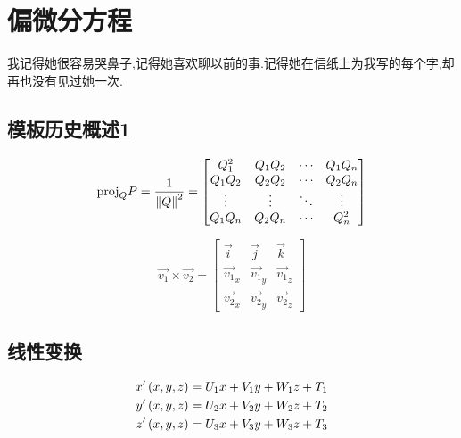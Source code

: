 \chapter{偏微分方程}
\begin{center}
    \textcolor[RGB]{255, 0, 0}{\faHeart}我记得她很容易哭鼻子,记得她喜欢聊以前的事.记得她在信纸上为我写的每个字,却再也没有见过她一次.\textcolor[RGB]{255, 0, 0}{\faHeart}
\end{center}
\vspace{-5pt}
\begin{center}
\end{center}

\section{模板历史概述1}
\[
    \mathrm{proj}_QP=\frac{1}{\left\| Q \right\|^2}=
    \begin{bmatrix}
        Q_1^2  & Q_1Q_2 & \cdots & Q_1Q_n \\
        Q_1Q_2 & Q_2Q_2 & \cdots & Q_2Q_n \\
        \vdots & \vdots & \ddots & \vdots \\
        Q_1Q_n & Q_2Q_n & \cdots & Q_n^2  \\
    \end{bmatrix}
\]

\[
    \overrightarrow{v_1} \times \overrightarrow{v_2} = \begin{bmatrix}
        \vec{i}                & \vec{j}                & \vec{k}                \\
        \overrightarrow{v_1}_x & \overrightarrow{v_1}_y & \overrightarrow{v_1}_z \\
        \overrightarrow{v_2}_x & \overrightarrow{v_2}_y & \overrightarrow{v_2}_z
    \end{bmatrix}
\]

\section{线性变换}

\begin{align*}
    x'\left(x,y,z\right) & = U_1x+V_1y+W_1z+T_1 \\
    y'\left(x,y,z\right) & = U_2x+V_2y+W_2z+T_2 \\
    z'\left(x,y,z\right) & = U_3x+V_3y+W_3z+T_3
\end{align*}

